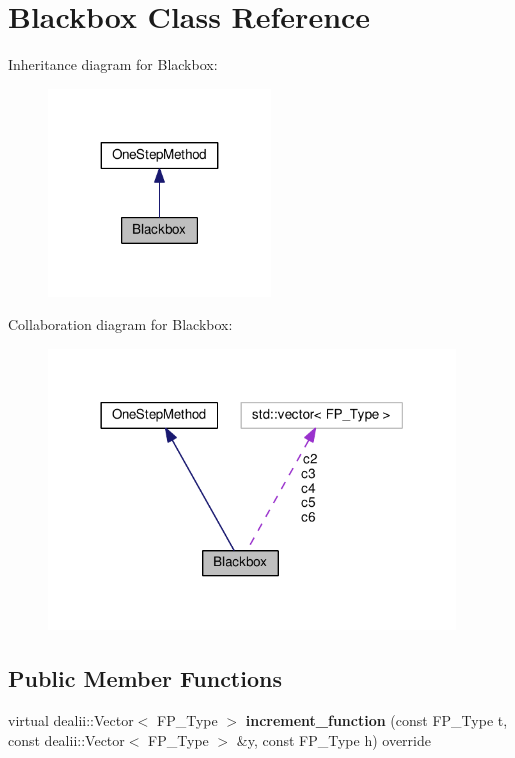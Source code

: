 \hypertarget{classBlackbox}{}\section{Blackbox Class Reference}
\label{classBlackbox}


Inheritance diagram for Blackbox\+:\nopagebreak
\begin{figure}[H]
\begin{center}
\leavevmode
\includegraphics[width=167pt]{classBlackbox__inherit__graph}
\end{center}
\end{figure}


Collaboration diagram for Blackbox\+:\nopagebreak
\begin{figure}[H]
\begin{center}
\leavevmode
\includegraphics[width=306pt]{classBlackbox__coll__graph}
\end{center}
\end{figure}
\subsection*{Public Member Functions}
\begin{DoxyCompactItemize}
\item 
\mbox{\label{classBlackbox_a38b421a2cc7fa40d8dadf09f44b9b80a}} 
virtual dealii\+::\+Vector$<$ F\+P\+\_\+\+Type $>$ {\bfseries increment\+\_\+function} (const F\+P\+\_\+\+Type t, const dealii\+::\+Vector$<$ F\+P\+\_\+\+Type $>$ \&y, const F\+P\+\_\+\+Type h) override
\end{DoxyCompactItemize}
